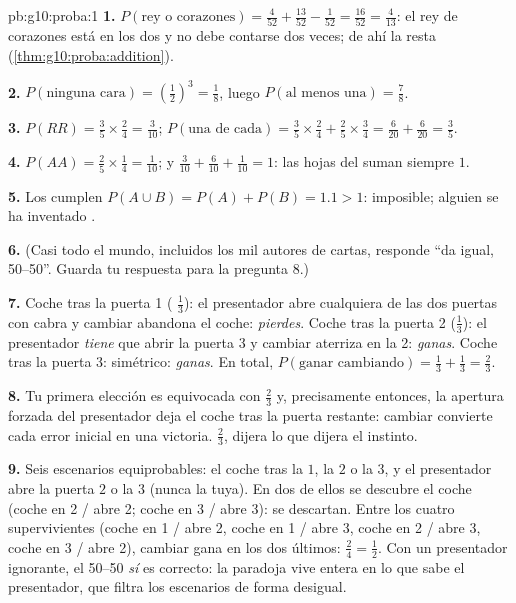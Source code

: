 \begin{solution}{pb:g10:proba:1}
\textbf{1.} $P(\text{rey o corazones}) = \frac{4}{52} +
\frac{13}{52} - \frac{1}{52} = \frac{16}{52} = \frac{4}{13}$: el rey de
corazones está en los dos  y no debe contarse dos veces; de ahí la
resta (\cref{thm:g10:proba:addition}).

\textbf{2.} $P(\text{ninguna cara}) = \left(\frac12\right)^3 = \frac18$,
luego $P(\text{al menos una}) = \frac78$.

\textbf{3.} $P(RR) = \frac35 \times \frac24 = \frac{3}{10}$;
$P(\text{una de cada}) = \frac35 \times \frac24 + \frac25
\times \frac34 = \frac{6}{20} + \frac{6}{20} = \frac35$.

\textbf{4.} $P(AA) = \frac25 \times \frac14 = \frac1{10}$; y
$\frac{3}{10} + \frac{6}{10} + \frac{1}{10} = 1$: las hojas del 
suman siempre $1$.

\textbf{5.} Los  cumplen $P(A \cup B) = P(A) +
P(B) = 1.1 > 1$: imposible; alguien se ha inventado .

\textbf{6.} (Casi todo el mundo, incluidos los mil autores de cartas,
responde ``da igual, 50--50''. Guarda tu respuesta para la pregunta 8.)

\textbf{7.} Coche tras la puerta 1 ( $\frac13$): el
presentador abre cualquiera de las dos puertas con cabra y cambiar
abandona el coche: \emph{pierdes}. Coche tras la puerta 2 ($\frac13$): el
presentador \emph{tiene} que abrir la puerta 3 y cambiar aterriza en la
2: \emph{ganas}. Coche tras la puerta 3: simétrico: \emph{ganas}. En
total, $P(\text{ganar cambiando}) = \frac13 + \frac13 = \frac23$.

\textbf{8.} Tu primera elección es equivocada con  $\frac23$
y, precisamente entonces, la apertura forzada del presentador deja el
coche tras la puerta restante: cambiar convierte cada error inicial en una
victoria. $\frac23$, dijera lo que dijera el instinto.

\textbf{9.} Seis escenarios equiprobables: el coche tras la $1$, la $2$ o
la $3$, y el presentador abre la puerta $2$ o la $3$ (nunca la tuya). En
dos de ellos se descubre el coche (coche en 2 / abre 2; coche en 3 / abre
3): se descartan. Entre los cuatro supervivientes (coche en 1 / abre 2,
coche en 1 / abre 3, coche en 2 / abre 3, coche en 3 / abre 2), cambiar
gana en los dos últimos: $\frac24 = \frac12$. Con un presentador
ignorante, el 50--50 \emph{sí} es correcto: la paradoja vive entera en lo
que sabe el presentador, que filtra los escenarios de forma desigual.


\end{solution}
